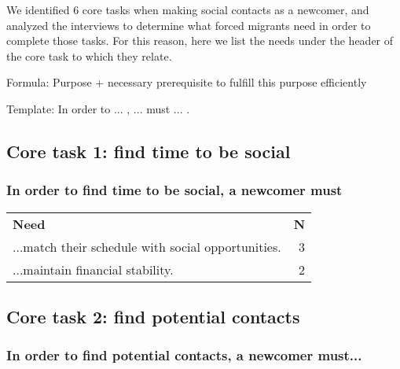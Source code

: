 We identified 6 core tasks when making social contacts as a newcomer, and analyzed the interviews to determine what forced migrants need in order to complete those tasks. For this reason, here we list the needs under the header of the core task to which they relate.

Formula: Purpose + necessary prerequisite to fulfill this purpose efficiently

Template: In order to ... , ... must ... .


\subsection*{Core task 1: find time to be social}

\subsubsection*{In order to find time to be social, a newcomer must}

\begin{longtable}{p{}r}
\textbf{Need}                                                                                              & \textbf{N} \\[12pt]
  ...match their schedule with social opportunities.                                                       & 3 \\
  ...maintain financial stability.                                                                         & 2 \\[12pt]
\end{longtable}

\subsection*{Core task 2: find potential contacts}

\subsubsection*{In order to find potential contacts, a newcomer must...}

